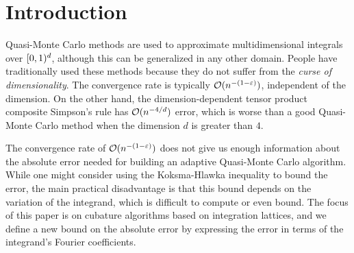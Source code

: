 \documentclass[graybox]{svmult}
\begin{document}

\section{Introduction}
Quasi-Monte Carlo methods are used to approximate multidimensional integrals over $[0,1)^d$, although this can be generalized in any other domain. People have traditionally used these methods because they do not suffer from the \textit{curse of dimensionality}.  The convergence rate is typically $\mathcal{O}(n^{-(1-\varepsilon)})$, independent of the dimension. On the other hand, the dimension-dependent tensor product composite Simpson's rule has $\mathcal{O}(n^{-4/d})$ error, which is worse than a good Quasi-Monte Carlo method when the dimension $d$ is greater than $4$.

The convergence rate  of  $\mathcal{O}(n^{-(1-\varepsilon)})$ does not give us enough information about the absolute error needed for building an adaptive Quasi-Monte Carlo algorithm. While one might consider using the Koksma-Hlawka inequality to bound the error, the main practical disadvantage is that this bound depends on the variation of the integrand, which is difficult to compute or even bound. The focus of this paper is on cubature algorithms based on integration lattices, and we define a new bound on the absolute error by expressing the error in terms of the integrand's Fourier coefficients.
\end{document}
